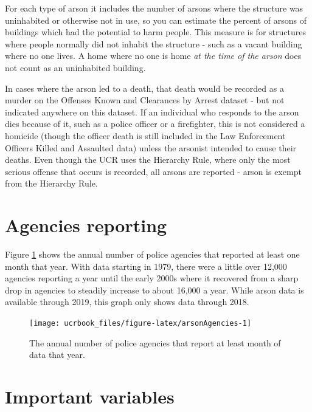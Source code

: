 \documentclass[
  12pt,
  openany]{book}
\begin{document}
For each type of arson it includes the number of arsons where the structure was uninhabited or otherwise not in use, so you can estimate the percent of arsons of buildings which had the potential to harm people. This measure is for structures where people normally did not inhabit the structure - such as a vacant building where no one lives. A home where no one is home \emph{at the time of the arson} does not count as an uninhabited building.

In cases where the arson led to a death, that death would be recorded as a murder on the Offenses Known and Clearances by Arrest dataset - but not indicated anywhere on this dataset. If an individual who responds to the arson dies because of it, such as a police officer or a firefighter, this is not considered a homicide (though the officer death is still included in the Law Enforcement Officers Killed and Assaulted data) unless the arsonist intended to cause their deaths. Even though the UCR uses the Hierarchy Rule, where only the most serious offense that occurs is recorded, all arsons are reported - arson is exempt from the Hierarchy Rule.

\hypertarget{agencies-reporting-5}{%
\section{Agencies reporting}\label{agencies-reporting-5}}

Figure \ref{fig:arsonAgencies} shows the annual number of police agencies that reported at least one month that year. With data starting in 1979, there were a little over 12,000 agencies reporting a year until the early 2000s where it recovered from a sharp drop in agencies to steadily increase to about 16,000 a year. While arson data is available through 2019, this graph only shows data through 2018.

\begin{figure}

{\centering \texttt{[image: ucrbook\_files/figure-latex/arsonAgencies-1]} 

}

\caption{The annual number of police agencies that report at least month of data that year.}\label{fig:arsonAgencies}
\end{figure}

\hypertarget{important-variables-5}{%
\section{Important variables}\label{important-variables-5}}
\end{document}
